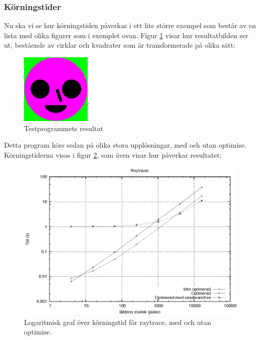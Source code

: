 \documentclass[Rapport]{subfiles}
\begin{document}
\subsubsection{Körningstider}

Nu ska vi se hur körningstiden påverkas i ett lite större exempel som består av
en lista med olika figurer som i exemplet ovan. Figur \ref{fig:Resultat:shapes:bild} visar hur
resultatbilden ser ut, bestående av cirklar och kvadrater som är transformerade på olika sätt:

\begin{figure}[H]
\centering
    \includegraphics[width=0.3\textwidth]{img/shapes.png}
    \caption{Testprogrammets resultat}
    \label{fig:Resultat:shapes:bild}
\end{figure}

Detta program körs sedan på olika stora upplösningar, med och utan optimise. 
Körningstiderna visas i figur \ref{fig:Resultat:shapes:graf}, som även visar
hur  påverkar resultatet:

\begin{figure}[H]
\includegraphics{shapes.eps}
\caption{Logaritmisk graf över körningstid för raytrace, med och utan optimise.}
\label{fig:Resultat:shapes:graf}
\end{figure}
\end{document}
